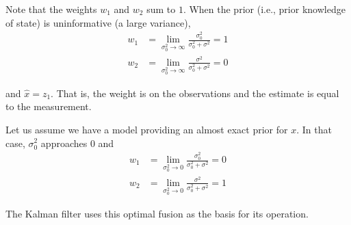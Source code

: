 Note that the weights $w_1$ and $w_2$ sum to $1$. When the prior (i.e., prior
knowledge of \gls{state}) is uninformative (a large variance),
\begin{align}
  w_1 &= \lim_{\sigma_0^2 \to \infty} \frac{\sigma_0^2}{\sigma_0^2 + \sigma^2} = 1 \\
  w_2 &= \lim_{\sigma_0^2 \to \infty} \frac{\sigma^2}{\sigma_0^2 + \sigma^2} = 0
\end{align}

and $\hat{x} = z_1$. That is, the weight is on the observations and the estimate
is equal to the measurement.

Let us assume we have a \gls{model} providing an almost exact prior for $x$. In
that case, $\sigma_0^2$ approaches 0 and
\begin{align}
  w_1 &= \lim_{\sigma_0^2 \to 0} \frac{\sigma_0^2}{\sigma_0^2 + \sigma^2} = 0 \\
  w_2 &= \lim_{\sigma_0^2 \to 0} \frac{\sigma^2}{\sigma_0^2 + \sigma^2} = 1
\end{align}

The Kalman filter uses this optimal fusion as the basis for its operation.
